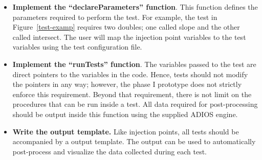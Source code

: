 \begin{itemize}
 \item {\bf Implement the ``declareParameters'' function}. This function defines the parameters required to perform
 the test. For example, the test in Figure~\ref{test-examp} requires two doubles; one called slope and the other called intersect. The user will map the injection point variables to the test variables using the test configuration file. 
 \item {\bf Implement the ``runTests'' function}. The variables passed to the test are direct pointers to the variables in the code. Hence, tests should not modify the pointers in any way; however, the phase I prototype does not strictly enforce this requirement. Beyond that requirement, there is not limit on the procedures that can be run inside a test. All data required for post-processing should be output inside this function using the supplied ADIOS engine. 
 \item {\bf Write the output template.} Like injection points, all tests should be accompanied by a output template. The output can be used to automatically post-process and visualize the data collected during each test. 
\end{itemize}

